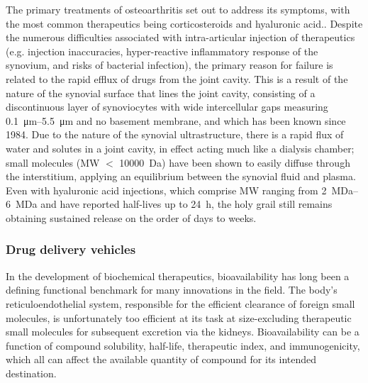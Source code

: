 \begin{refsection}
The primary treatments of osteoarthritis set out to address its symptoms, with
the most common therapeutics being corticosteroids and hyaluronic
acid.\cite{Butoescu2009}. Despite the numerous difficulties associated with
intra-articular injection of therapeutics (e.g. injection inaccuracies,
hyper-reactive inflammatory response of the synovium, and risks of bacterial
infection), the primary reason for failure is related to the rapid efflux of
drugs from the joint cavity.\cite{Ayral2001} This is a result of the
nature of the synovial surface that lines the joint cavity, consisting of a
discontinuous layer of synoviocytes with wide intercellular gaps measuring
\SIrange{0.1}{5.5}{\um} and no basement membrane, and which has been known since
1984.\cite{Knight1984} Due to the nature of the synovial ultrastructure, there
is a rapid flux of water and solutes in a joint cavity, in effect acting 
much like a dialysis chamber; small molecules (MW ${<}$ \SI{10000}{\dalton}) have
been shown to easily diffuse through the interstitium, applying an equilibrium
between the synovial fluid and plasma.\cite{Gerwin2006,Okuyama1984} Even with
hyaluronic acid injections, which comprise MW ranging from
\SIrange{2}{6}{\mega\dalton} and have reported half-lives up to \SI{24}{\hour},
the holy grail still remains obtaining sustained release on the order of days to
weeks.

\subsubsection{Drug delivery vehicles}

In the development of biochemical therapeutics, bioavailability has long been a
defining functional benchmark for many innovations in the field. The body's
reticuloendothelial system, responsible for the efficient clearance of foreign
small molecules, is unfortunately too efficient at its task at size-excluding
therapeutic small molecules for subsequent excretion via the kidneys.
Bioavailability can be a function of compound solubility, 
half-life, therapeutic index, and immunogenicity, which all can affect the
available quantity of compound for its intended
destination.\cite{Petros2010,Davis2008,Shah1992}


\end{refsection}

